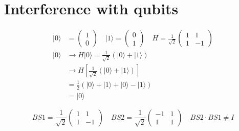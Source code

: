 \section{Interference with qubits}

\begin{equation}
\begin{aligned}
|0\rangle &=\left(\begin{array}{l}
1 \\
0
\end{array}\right) \quad|1\rangle=\left(\begin{array}{l}
0 \\
1
\end{array}\right) \quad H=\frac{1}{\sqrt{2}}\left(\begin{array}{cc}
1 & 1 \\
1 & -1
\end{array}\right) \\
|0\rangle & \longrightarrow H|0\rangle=\frac{1}{\sqrt{2}}(|0\rangle+|1\rangle) \\
& \longrightarrow H\left[\frac{1}{\sqrt{2}}(|0\rangle+|1\rangle)\right] \\
&=\frac{1}{2}(|0\rangle+|1\rangle+|0\rangle-|1\rangle) \\
&=|0\rangle
\end{aligned}
\end{equation}

\begin{equation}
B S 1=\frac{1}{\sqrt{2}}\left(\begin{array}{cc}
1 & 1 \\
1 & -1
\end{array}\right) \quad B S 2=\frac{1}{\sqrt{2}}\left(\begin{array}{cc}
-1 & 1 \\
1 & 1
\end{array}\right) \quad B S 2 \cdot B S 1 \neq I
\end{equation}

